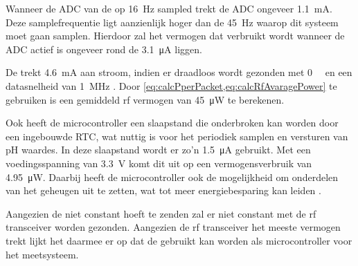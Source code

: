 Wanneer de ADC van de \mcu op \qty{16}{\hertz} sampled trekt de ADC ongeveer \qty{1.1}{\milli\ampere}. Deze samplefrequentie ligt aanzienlijk hoger dan de \qty{45}{\hertz} waarop dit systeem moet gaan samplen. Hierdoor zal het vermogen dat verbruikt wordt wanneer de ADC actief is ongeveer rond de \qty{3.1}{\micro\ampere} liggen.

De \mcu trekt \qty{4.6}{\milli\ampere} aan stroom, indien er draadloos wordt gezonden met \qty{0}{\deci\belmilliwatt} en een datasnelheid van \qty{1}{\mega\hertz} \cite{nrf52810}. Door \cref{eq:calcPperPacket,eq:calcRfAvaragePower} te gebruiken is een gemiddeld rf vermogen van \qty{45}{\micro\watt} te berekenen.

Ook heeft de microcontroller een slaapstand die onderbroken kan worden door een ingebouwde RTC, wat nuttig is voor het periodiek samplen en versturen van pH waardes. In deze slaapstand wordt er zo'n \qty{1.5}{\micro\ampere} gebruikt. Met een voedingsspanning van \qty{3.3}{\volt} komt dit uit op een vermogensverbruik van \qty{4.95}{\micro\watt}. Daarbij heeft de microcontroller ook de mogelijkheid om onderdelen van het geheugen uit te zetten, wat tot meer energiebesparing kan leiden \cite{nrf52810}.

Aangezien de \mcu niet constant hoeft te zenden zal er niet constant met de rf transceiver worden gezonden. Aangezien de rf transceiver het meeste vermogen trekt lijkt het daarmee er op dat de \mcu gebruikt kan worden als microcontroller voor het \si{\pH} meetsysteem.